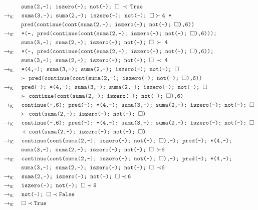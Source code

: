 \documentclass{article}
\newcommand{\tx}[1]{\textcolor{Black} {\texttt{#1}}}
\newcommand{\es}{$\square$}
\newcommand{\pop}[2]{ \tx{#1} \succ \tx{#2}}
\newcommand{\push}[2]{ \tx{#1} \prec \tx{#2}}
\newcommand{\kr}{\rightarrow_{\mathcal{K}} \quad}
\begin{document}
\begin{enumerate}
\begin{enumerate}
\begin{align*}
			&\tx{\quad \quad \quad suma(2,-); iszero(-); not(-); \es $\ \prec $ True} \\			
			&\kr \pop{suma(3,-); suma(2,-); iszero(-); not(-); \es} {4 *}\\
			&\tx{\quad \quad \quad pred(continue(cont(suma(2,-); iszero(-); not(-); \es),6))} \\
			&\kr \tx{*(-, pred(continue(cont(suma(2,-); iszero(-); not(-); \es),6)));}\\
			&\tx{\quad \quad \quad suma(3,-); suma(2,-); iszero(-); not(-); \es $\ \succ $ 4}\\
			&\kr \tx{*(-, pred(continue(cont(suma(2,-); iszero(-); not(-); \es),6));}\\
			&\tx{\quad \quad \quad suma(3,-); suma(2,-); iszero(-); not(-); \es $\ \prec $ 4}\\
			&\kr \tx{*(4,-); suma(3,-); suma(2,-); iszero(-); not(-); \es}\\
			&\tx{\quad \quad \quad $\succ $ pred(continue(cont(suma(2,-); iszero(-); not(-); \es),6))}\\
			&\kr \tx{pred(-); *(4,-); suma(3,-); suma(2,-); iszero(-); not(-); \es}\\
			&\tx{\quad \quad \quad $\succ $ continue(cont(suma(2,-); iszero(-); not(-); \es),6)}\\
			&\kr \tx{continue(-,6); pred(-); *(4,-); suma(3,-); suma(2,-); iszero(-); not(-); \es}\\
			&\tx{\quad \quad \quad $\succ $ cont(suma(2,-); iszero(-); not(-); \es)}\\
			&\kr \tx{continue(-,6); pred(-); *(4,-); suma(3,-); suma(2,-); iszero(-); not(-); \es}\\
			&\tx{\quad \quad \quad $\prec $ cont(suma(2,-); iszero(-); not(-); \es)}\\
			&\kr \tx{continue(cont(suma(2,-); iszero(-); not(-); \es),-); pred(-); *(4,-);}\\
			&\tx {\quad \quad \quad suma(3,-); suma(2,-); iszero(-); not(-); \es  $\ \succ $6}\\
			&\kr \tx{continue(cont(suma(2,-); iszero(-); not(-); \es),-); pred(-); *(4,-);}\\
			&\tx {\quad \quad \quad suma(3,-); suma(2,-); iszero(-); not(-); \es  $\ \prec $6}\\
			&\kr \push {suma(2,-); iszero(-); not(-); \es}{6}\\
			&\kr \push {iszero(-); not(-); \es}{8}\\
			&\kr \push {not(-); \es}{False}\\
			&\kr \push {\es}{True}\\
			\end{align*} 


\end{enumerate}
\end{enumerate}
\end{document}
